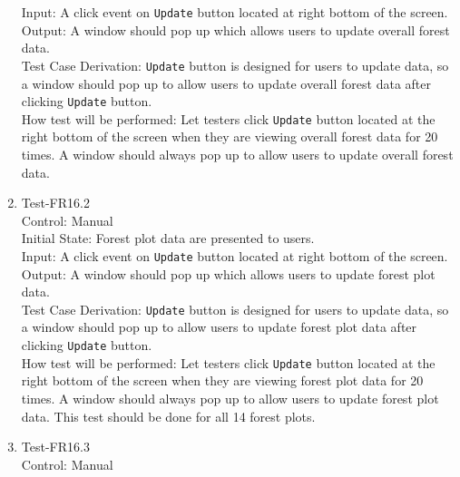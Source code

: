 \documentclass[12pt, titlepage]{article}
\begin{document}
\begin{enumerate}
Input: A click event on \verb|Update| button located at right bottom of the screen.\\

Output: A window should pop up which allows users to update overall forest data.\\

Test Case Derivation: \verb|Update| button is designed for users to update data,
so a window should pop up to allow users to update overall forest data
after clicking \verb|Update| button.\\
					
How test will be performed:  Let testers click \verb|Update| button located 
at the right bottom of the screen when they are viewing overall forest data for 20 times. A window should always pop up to allow users to update overall forest data.

\item{Test-FR16.2\\}
Control: Manual\\ 

Initial State: Forest plot data are presented to users.\\

Input: A click event on \verb|Update| button located at right bottom of the screen.\\

Output: A window should pop up which allows users to update forest plot data.\\

Test Case Derivation: \verb|Update| button is designed for users to update data,
so a window should pop up to allow users to update forest plot data
after clicking \verb|Update| button.\\
					
How test will be performed:  Let testers click \verb|Update| button located 
at the right bottom of the screen when they are viewing forest plot data for 20 times. A window should always pop up to allow users to update forest plot data. This test 
should be done for all 14 forest plots.

\item{Test-FR16.3\\}
Control: Manual\\ 


\end{enumerate}
\end{document}
